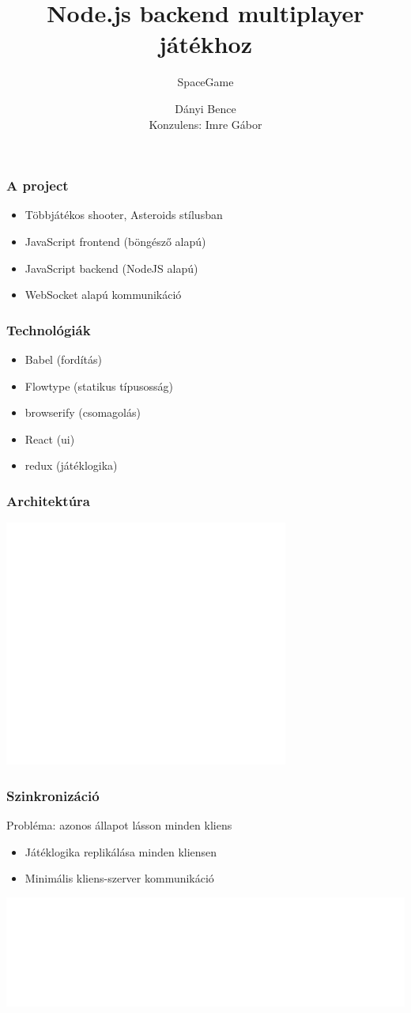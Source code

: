 \documentclass[xetex,14pt]{beamer}
\title{Node.js backend multiplayer játékhoz}
\subtitle{SpaceGame}
\author{Dányi Bence\\\small{Konzulens: Imre Gábor}}
\begin{document}
  \frame{\titlepage}
  \begin{frame}
    \frametitle{A project}
    \begin{itemize}
      \item Többjátékos shooter, Asteroids stílusban
      \item JavaScript frontend (böngésző alapú)
      \item JavaScript backend (NodeJS alapú)
      \item WebSocket alapú kommunikáció
    \end{itemize}
  \end{frame}
  \begin{frame}
    \frametitle{Technológiák}
    \begin{itemize}
      \item Babel (fordítás)
      \item Flowtype (statikus típusosság)
      \item browserify (csomagolás)
      \item React (ui)
      \item redux (játéklogika)
    \end{itemize}
  \end{frame}
  \begin{frame}
    \frametitle{Architektúra}
    \begin{center}
      \includegraphics[width=0.7\textwidth]{figures/app-white}
    \end{center}
  \end{frame}
  \begin{frame}
    \frametitle{Szinkronizáció}
    Probléma: azonos állapot lásson minden kliens
    \begin{itemize}
      \item Játéklogika replikálása minden kliensen
      \item Minimális kliens-szerver kommunikáció
    \end{itemize}
    \vfill
    \includegraphics[width=\textwidth]{figures/ws-white}
  \end{frame}
\end{document}
